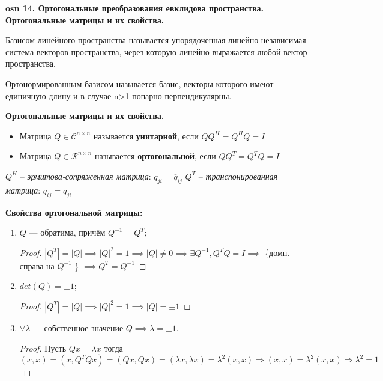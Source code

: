 \setcounter{section}{15}
\setcounter{subsection}{14}
\setcounter{equation}{0}
\textbf{\LARGE osn 14. Ортогональные преобразования евклидова пространства. Ортогональные матрицы и их свойства.}

Базисом линейного пространства называется упорядоченная линейно независимая система векторов пространства, через которую линейно выражается любой вектор пространства. 

Ортонормированным базисом называется
базис, векторы которого имеют единичную длину и в случае n>1 попарно перпендикулярны. 

\textbf{Ортогональные матрицы и их свойства.}
\begin{itemize}
    \item Матрица $Q \in \mathcal{C}^{n \times n}$ называется \textbf{унитарной}, если \newline $QQ^H = Q^HQ=I$
    \item Матрица $Q \in \mathcal{R}^{n \times n}$ называется \textbf{ортогональной}, если \newline $QQ^T = Q^TQ=I$
 
\end{itemize}   

$Q^H$ -- \textit{эрмитова-сопряженная матрица}: $q_{ji} = \overline{q}_{ij}$   \newline
$Q^T$ -- \textit{транспонированная матрица}: $q_{ij} = q_{ji}$

\textbf{Свойства ортогональной матрицы:}
    \begin{enumerate}
        \item $Q$ --- обратима, причём $Q^{-1}=Q^T$;
        
        \begin{proof}
        $\left|Q^T\right|=\left|Q\right| \implies \left|Q\right|^2 = 1 \implies \left|Q\right| \neq 0 \implies \exists Q^{-1}, Q^TQ=I \implies$ \{домн. справа на $Q^{-1}$ \} $\implies Q^T=Q^{-1}$
        \end{proof}
        
        \item $det(Q) = \pm1$;
        
        \begin{proof}
        $\left|Q^T\right|=\left|Q\right| \implies \left|Q\right|^2 = 1 \implies \left|Q\right| = \pm 1$
        \end{proof}
        
        \item $\forall \lambda$ --- собственное значение $Q\implies \lambda=\pm1$.
        \begin{proof}
        Пусть $Qx=\lambda x$ тогда $(x,x)=(x,Q^TQx) = (Qx,Qx) = (\lambda x,\lambda x) = \lambda^2(x,x) \Rightarrow (x,x) = \lambda^2(x,x) \Rightarrow \lambda^2 = 1$

        \end{proof}
    \end{enumerate}
 
